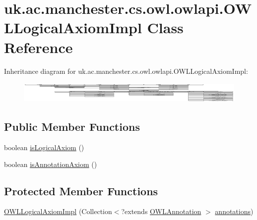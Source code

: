 \hypertarget{classuk_1_1ac_1_1manchester_1_1cs_1_1owl_1_1owlapi_1_1_o_w_l_logical_axiom_impl}{\section{uk.\-ac.\-manchester.\-cs.\-owl.\-owlapi.\-O\-W\-L\-Logical\-Axiom\-Impl Class Reference}
\label{classuk_1_1ac_1_1manchester_1_1cs_1_1owl_1_1owlapi_1_1_o_w_l_logical_axiom_impl}
}
Inheritance diagram for uk.\-ac.\-manchester.\-cs.\-owl.\-owlapi.\-O\-W\-L\-Logical\-Axiom\-Impl\-:\begin{figure}[H]
\begin{center}
\leavevmode
\includegraphics[height=1.060773cm]{classuk_1_1ac_1_1manchester_1_1cs_1_1owl_1_1owlapi_1_1_o_w_l_logical_axiom_impl}
\end{center}
\end{figure}
\subsection*{Public Member Functions}
\begin{DoxyCompactItemize}
\item 
boolean \hyperlink{classuk_1_1ac_1_1manchester_1_1cs_1_1owl_1_1owlapi_1_1_o_w_l_logical_axiom_impl_a27f35b5bf1f20862b5ac1e71f622dded}{is\-Logical\-Axiom} ()
\item 
boolean \hyperlink{classuk_1_1ac_1_1manchester_1_1cs_1_1owl_1_1owlapi_1_1_o_w_l_logical_axiom_impl_a0994d2fe77961dd8094bd641be03db1a}{is\-Annotation\-Axiom} ()
\end{DoxyCompactItemize}
\subsection*{Protected Member Functions}
\begin{DoxyCompactItemize}
\item 
\hyperlink{classuk_1_1ac_1_1manchester_1_1cs_1_1owl_1_1owlapi_1_1_o_w_l_logical_axiom_impl_ae72a8ff81ff92f79f2fc501c16ed58af}{O\-W\-L\-Logical\-Axiom\-Impl} (Collection$<$?extends \hyperlink{interfaceorg_1_1semanticweb_1_1owlapi_1_1model_1_1_o_w_l_annotation}{O\-W\-L\-Annotation} $>$ \hyperlink{classuk_1_1ac_1_1manchester_1_1cs_1_1owl_1_1owlapi_1_1_o_w_l_axiom_impl_af6fbf6188f7bdcdc6bef5766feed695e}{annotations})
\end{DoxyCompactItemize}
